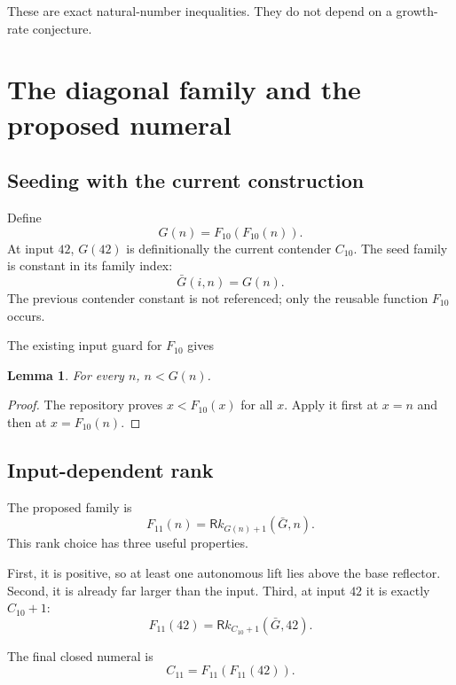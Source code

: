 \documentclass[11pt,oneside]{article}
\newtheorem{lemma}[theorem]{Lemma}
\theoremstyle{definition}
\newcommand{\Ram}{\mathsf Rk}
\begin{document}
These are exact natural-number inequalities.  They do not depend on a growth-
rate conjecture.

\section{The diagonal family and the proposed numeral}

\subsection{Seeding with the current construction}

Define
\begin{equation}\label{eq:family10}
 G(n)=F_{10}(F_{10}(n)).
\end{equation}
At input $42$, $G(42)$ is definitionally the current contender $C_{10}$.  The
seed family is constant in its family index:
\[
 \bar G(i,n)=G(n).
\]
The previous contender constant is not referenced; only the reusable function
$F_{10}$ occurs.

The existing input guard for $F_{10}$ gives
\begin{lemma}\label{lem:input-family10}
For every $n$, $n<G(n)$.
\end{lemma}
\begin{proof}
The repository proves $x<F_{10}(x)$ for all $x$.  Apply it first at $x=n$ and
then at $x=F_{10}(n)$.
\end{proof}

\subsection{Input-dependent rank}

The proposed family is
\begin{equation}\label{eq:F11again}
 F_{11}(n)=\Ram_{G(n)+1}(\bar G,n).
\end{equation}
This rank choice has three useful properties.

First, it is positive, so at least one autonomous lift lies above the base
reflector.  Second, it is already far larger than the input.  Third, at input
$42$ it is exactly $C_{10}+1$:
\begin{equation}\label{eq:rank42}
 F_{11}(42)=\Ram_{C_{10}+1}(\bar G,42).
\end{equation}

The final closed numeral is
\begin{equation}\label{eq:C11}
 C_{11}=F_{11}(F_{11}(42)).
\end{equation}
\end{document}
